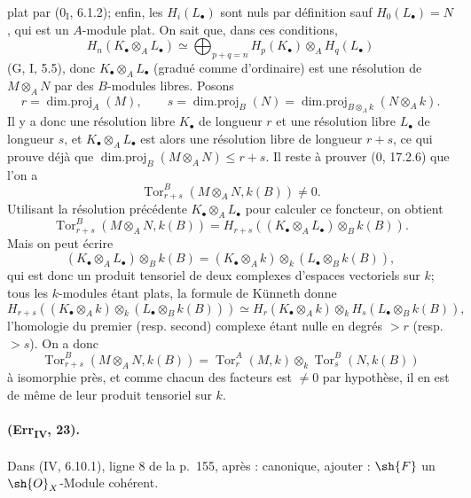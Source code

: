 plat par ($0_{\mathrm I}$, 6.1.2); enfin, les $H_i(L_\bullet)$ sont nuls
par définition sauf $H_0(L_\bullet)=N$, qui est un $A$-module plat. On
sait que, dans ces conditions,
\[
 H_n(K_\bullet\otimes_AL_\bullet)\simeq
 \bigoplus_{p+q=n}
 H_p(K_\bullet)\otimes_AH_q(L_\bullet)
\]
(G, I, 5.5), donc $K_\bullet\otimes_AL_\bullet$ (gradué comme
d'ordinaire) est une résolution de $M\otimes_AN$ par des $B$-modules
libres. Posons
\[
 r=\operatorname{dim.proj}_A(M),\qquad
 s=\operatorname{dim.proj}_B(N)=
 \operatorname{dim.proj}_{B\otimes_Ak}(N\otimes_Ak).
\]
Il y a donc une résolution libre $K_\bullet$ de longueur $r$ et une
résolution libre $L_\bullet$ de longueur $s$, et
$K_\bullet\otimes_AL_\bullet$ est alors une résolution libre de longueur
$r+s$, ce qui prouve déjà que
$\operatorname{dim.proj}_B(M\otimes_AN)\leq r+s$. Il reste à prouver
($0$, 17.2.6) que l'on a
\[
 \operatorname{Tor}^{B}_{r+s}(M\otimes_AN,k(B))\neq0.
\]
Utilisant la résolution précédente $K_\bullet\otimes_AL_\bullet$ pour
calculer ce foncteur, on obtient
\[
 \operatorname{Tor}^{B}_{r+s}(M\otimes_AN,k(B))=
 H_{r+s}((K_\bullet\otimes_AL_\bullet)\otimes_Bk(B)).
\]
Mais on peut écrire
\[
 (K_\bullet\otimes_AL_\bullet)\otimes_Bk(B)=
 (K_\bullet\otimes_Ak)\otimes_k
 (L_\bullet\otimes_Bk(B)),
\]
qui est donc un produit tensoriel de deux complexes d'espaces
vectoriels sur $k$; tous les $k$-modules étant plats, la formule de
Künneth donne
\[
 H_{r+s}((K_\bullet\otimes_Ak)\otimes_k
 (L_\bullet\otimes_Bk(B)))\simeq
 H_r(K_\bullet\otimes_Ak)\otimes_k
 H_s(L_\bullet\otimes_Bk(B)),
\]
l'homologie du premier (resp. second) complexe étant nulle en degrés
$>r$ (resp. $>s$). On a donc
\[
 \operatorname{Tor}^{B}_{r+s}(M\otimes_AN,k(B))=
 \operatorname{Tor}^{A}_{r}(M,k)\otimes_k
 \operatorname{Tor}^{B}_{s}(N,k(B))
\]
à isomorphie près, et comme chacun des facteurs est $\neq0$ par
hypothèse, il en est de même de leur produit tensoriel sur $k$.

\paragraph{(Err\textsubscript{IV}, 23).}
Dans (IV, 6.10.1), ligne 8 de la p.~155, après : canonique, ajouter :
$\sh{F}$ un $\sh{O}_X$-Module cohérent.

